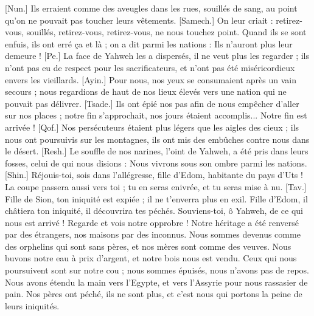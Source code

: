 \begin{multicols}{2}
[Nun.] Ils erraient comme des aveugles dans les rues, souillés de sang, au point qu'on ne pouvait pas toucher leurs vêtements.
[Samech.] On leur criait : retirez-vous, souillés, retirez-vous, retirez-vous, ne nous touchez point. Quand ils se sont enfuis, ils ont erré ça et là ; on a dit parmi les nations : Ils n'auront plus leur demeure !
[Pe.] La face de Yahweh les a dispersés, il ne veut plus les regarder ; ils n’ont pas eu de respect pour les sacrificateurs, et n'ont pas été miséricordieux envers les vieillards.
[Ayin.] Pour nous, nos yeux se consumaient après un vain secours ; nous regardions de haut de nos lieux élevés vers une nation qui ne pouvait pas délivrer.
[Tsade.] Ils ont épié nos pas afin de nous empêcher d'aller sur nos places ; notre fin s'approchait, nos jours étaient accomplis... Notre fin est arrivée !
[Qof.] Nos persécuteurs étaient plus légers que les aigles des cieux ; ils nous ont poursuivis sur les montagnes, ils ont mis des embûches contre nous dans le désert.
[Resh.] Le souffle de nos narines, l’oint de Yahweh, a été pris dans leurs fosses, celui de qui nous disions : Nous vivrons sous son ombre parmi les nations.
[Shin.] Réjouis-toi, sois dans l’allégresse, fille d’Edom, habitante du pays d'Uts ! La coupe passera aussi vers toi ; tu en seras enivrée, et tu seras mise à nu.
[Tav.] Fille de Sion, ton iniquité est expiée ; il ne t'enverra plus en exil. Fille d’Edom, il châtiera ton iniquité, il découvrira tes péchés.
\VerseOne{}Souviens-toi, ô Yahweh, de ce qui nous est arrivé ! Regarde et vois notre opprobre !
Notre héritage a été renversé par des étrangers, nos maisons par des inconnus.
Nous sommes devenus comme des orphelins qui sont sans pères, et nos mères sont comme des veuves.
Nous buvons notre eau à prix d’argent, et notre bois nous est vendu.
Ceux qui nous poursuivent sont sur notre cou ; nous sommes épuisés, nous n’avons pas de repos.
Nous avons étendu la main vers l'Egypte, et vers l'Assyrie pour nous rassasier de pain.
Nos pères ont péché, ils ne sont plus, et c’est nous qui portons la peine de leurs iniquités.

\end{multicols}
